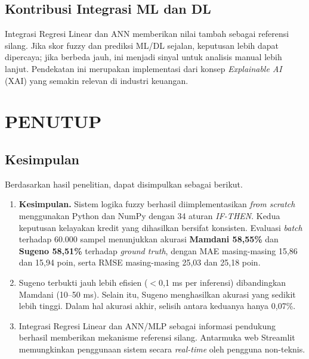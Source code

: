 \documentclass[12pt,a4paper]{report}
\begin{document}
\section{Kontribusi Integrasi ML dan DL}

Integrasi Regresi Linear dan ANN memberikan nilai tambah
sebagai referensi silang. Jika skor fuzzy dan prediksi
ML/DL sejalan, keputusan lebih dapat dipercaya; jika
berbeda jauh, ini menjadi sinyal untuk analisis manual
lebih lanjut. Pendekatan ini merupakan implementasi dari
konsep \textit{Explainable AI} (XAI) yang semakin relevan
di industri keuangan.

\chapter{PENUTUP}

\section{Kesimpulan}

Berdasarkan hasil penelitian, dapat disimpulkan sebagai berikut.

\begin{enumerate}[label=\arabic*.]
  \item \textbf{Kesimpulan.} Sistem logika fuzzy berhasil diimplementasikan \textit{from scratch} menggunakan Python dan NumPy dengan 34 aturan \textit{IF-THEN}. Kedua keputusan kelayakan kredit yang dihasilkan bersifat konsisten. Evaluasi \textit{batch} terhadap 60.000 sampel menunjukkan akurasi \textbf{Mamdani 58,55\%} dan \textbf{Sugeno 58,51\%} terhadap \textit{ground truth}, dengan MAE masing-masing 15,86 dan 15,94 poin, serta RMSE masing-masing 25,03 dan 25,18 poin.

  \item Sugeno terbukti jauh lebih efisien ($<$0{,}1 ms per
        inferensi) dibandingkan Mamdani (10--50 ms). Selain
        itu, Sugeno menghasilkan akurasi yang sedikit lebih tinggi.
        Dalam hal akurasi akhir, selisih antara keduanya hanya 0{,}07\%.

  \item Integrasi Regresi Linear dan ANN/MLP sebagai
        informasi pendukung berhasil memberikan mekanisme
        referensi silang. Antarmuka web Streamlit memungkinkan
        penggunaan sistem secara \textit{real-time} oleh
        pengguna non-teknis.
\end{enumerate}
\end{document}
